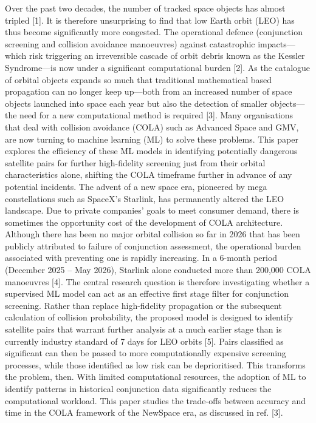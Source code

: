 \documentclass[letterpaper,11pt,leqno]{article}
\begin{document}
Over the past two decades, the number of tracked space objects has almost tripled [1]. It is therefore unsurprising to find that low Earth orbit (LEO) has thus become significantly more congested. The operational defence (conjunction screening and collision avoidance manoeuvres) against catastrophic impacts—which risk triggering an irreversible cascade of orbit debris known as the Kessler Syndrome—is now under a significant computational burden [2]. As the catalogue of orbital objects expands so much that traditional mathematical based propagation can no longer keep up—both from an increased number of space objects launched into space each year but also the detection of smaller objects—the need for a new computational method is required [3]. Many organisations that deal with collision avoidance (COLA) such as Advanced Space and GMV, are now turning to machine learning (ML) to solve these problems. This paper explores the efficiency of these ML models in identifying potentially dangerous satellite pairs for further high-fidelity screening just from their orbital characteristics alone, shifting the COLA timeframe further in advance of any potential incidents.
The advent of a new space era, pioneered by mega constellations such as SpaceX’s Starlink, has permanently altered the LEO landscape. Due to private companies’ goals to meet consumer demand, there is sometimes the opportunity cost of the development of COLA architecture. Although there has been no major orbital collision so far in 2026 that has been publicly attributed to failure of conjunction assessment, the operational burden associated with preventing one is rapidly increasing. In a 6-month period (December 2025 – May 2026), Starlink alone conducted more than 200,000 COLA manoeuvres [4].
The central research question is therefore investigating whether a supervised ML model can act as an effective first stage filter for conjunction screening. Rather than replace high-fidelity propagation or the subsequent calculation of collision probability, the proposed model is designed to identify satellite pairs that warrant further analysis at a much earlier stage than is currently industry standard of 7 days for LEO orbits [5]. Pairs classified as significant can then be passed to more computationally expensive screening processes, while those identified as low risk can be deprioritised. This transforms the problem, then. With limited computational resources, the adoption of ML to identify patterns in historical conjunction data significantly reduces the computational workload. This paper studies the trade-offs between accuracy and time in the COLA framework of the NewSpace era, as discussed in ref. [3].
\end{document}
